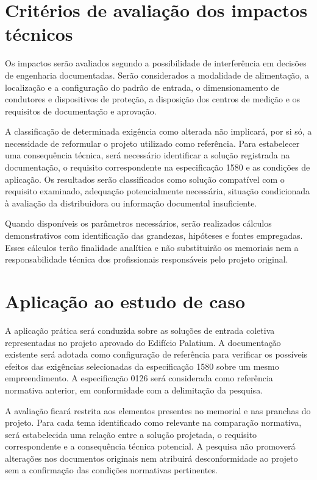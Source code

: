 \section{Critérios de avaliação dos impactos técnicos}
\label{sec:impactos}

Os impactos serão avaliados segundo a possibilidade de interferência em decisões de engenharia documentadas. Serão considerados a modalidade de alimentação, a localização e a configuração do padrão de entrada, o dimensionamento de condutores e dispositivos de proteção, a disposição dos centros de medição e os requisitos de documentação e aprovação.

A classificação de determinada exigência como alterada não implicará, por si só, a necessidade de reformular o projeto utilizado como referência. Para estabelecer uma consequência técnica, será necessário identificar a solução registrada na documentação, o requisito correspondente na especificação 1580 e as condições de aplicação. Os resultados serão classificados como solução compatível com o requisito examinado, adequação potencialmente necessária, situação condicionada à avaliação da distribuidora ou informação documental insuficiente.

Quando disponíveis os parâmetros necessários, serão realizados cálculos demonstrativos com identificação das grandezas, hipóteses e fontes empregadas. Esses cálculos terão finalidade analítica e não substituirão os memoriais nem a responsabilidade técnica dos profissionais responsáveis pelo projeto original.

\section{Aplicação ao estudo de caso}
\label{sec:estudocaso}

A aplicação prática será conduzida sobre as soluções de entrada coletiva representadas no projeto aprovado do Edifício Palatium. A documentação existente será adotada como configuração de referência para verificar os possíveis efeitos das exigências selecionadas da especificação 1580 sobre um mesmo empreendimento. A especificação 0126 será considerada como referência normativa anterior, em conformidade com a delimitação da pesquisa.

A avaliação ficará restrita aos elementos presentes no memorial e nas pranchas do projeto. Para cada tema identificado como relevante na comparação normativa, será estabelecida uma relação entre a solução projetada, o requisito correspondente e a consequência técnica potencial. A pesquisa não promoverá alterações nos documentos originais nem atribuirá desconformidade ao projeto sem a confirmação das condições normativas pertinentes.

